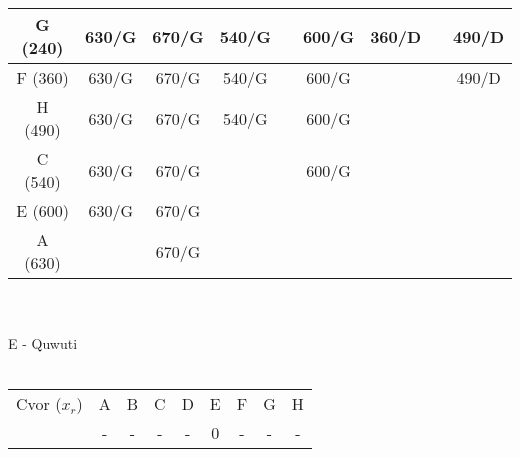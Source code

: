 \documentclass[12pt]{article}
\begin{document}
\begin{enumerate}
\begin{tabular}{|c|c|c|c|c|c|c|c|c|}
G (240)      & 630/G                        & 670/G                        & 540/G                        &                          & 600/G                         & {\color[HTML]{FE0000} 360/D} &                              & {\color[HTML]{333333} 490/D} \\ \hline
F (360)      & 630/G                        & 670/G                        & 540/G                        & {\color[HTML]{FE0000} }  & 600/G                         &                              & {\color[HTML]{FE0000} }      & {\color[HTML]{FE0000} 490/D} \\ \hline
H (490)      & 630/G                        & 670/G                        & {\color[HTML]{FE0000} 540/G} & {\color[HTML]{000000} }  & 600/G                         & {\color[HTML]{FE0000} }      &                              & {\color[HTML]{FE0000} }      \\ \hline
C (540)      & 630/G                        & 670/G                        & {\color[HTML]{FE0000} }      & {\color[HTML]{FE0000} }  & {\color[HTML]{FE0000} 600/G}  &                              &                              &                              \\ \hline
E (600)      & {\color[HTML]{FE0000} 630/G} & 670/G                        & {\color[HTML]{FE0000} }      & {\color[HTML]{FE0000} }  & {\color[HTML]{FE0000} }       &                              &                              &                              \\ \hline
A (630)      & {\color[HTML]{FE0000} }      & {\color[HTML]{FE0000} 670/G} &                              &                          &                               &                              &                              &                              \\ \hline
\end{tabular}
\\
\\
E - Quwuti
\\
\\
\begin{tabular}{|c|c|c|c|c|c|c|c|c|}
\hline
Cvor ($x_r$) & A                            & B                            & C                            & D                            & E                        & F                            & G                            & H                            \\ \cline{2-9} 
             & {\color[HTML]{000000} -}     & {\color[HTML]{333333} -}     & -                            & {\color[HTML]{000000} -}     & {\color[HTML]{FE0000} 0} & -                            & -                            & -                            \\ \hline

\end{tabular}
\end{enumerate}
\end{document}
